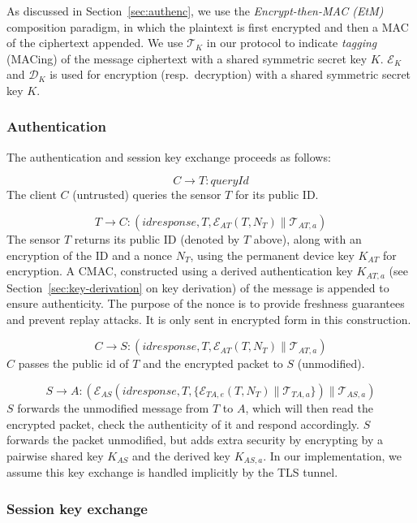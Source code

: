 As discussed in Section~\ref{sec:authenc}, we use the \textit{Encrypt-then-MAC (EtM)}  composition paradigm, in which the plaintext is first encrypted and then a MAC of the ciphertext appended. We use $\mathcal{T}_K$ in our protocol to indicate \textit{tagging} (MACing) of the message ciphertext with a shared symmetric secret key $K$. $\mathcal{E}_K$ and $\mathcal{D}_K$ is used for encryption (resp.\ decryption) with a shared symmetric secret key $K$.

\subsubsection{Authentication}

The authentication and session key exchange proceeds as follows:

\[
C \rightarrow T: \textit{queryId}
\]
%
The client $C$ (untrusted) queries the sensor $T$ for its public ID.

\[
T \rightarrow C: (\textit{idresponse}, T, \mathcal{E}_{AT}(T, N_T) \parallel \mathcal{T}_{AT,a})
\]
%
The sensor $T$ returns its public ID (denoted by $T$ above), along with an encryption of 
the ID and a nonce $N_T$, using the permanent device key $K_{AT}$ for
encryption. A CMAC, constructed using a derived authentication key $K_{AT,a}$ 
(see Section~\ref{sec:key-derivation} on key derivation) of the message is appended to ensure authenticity. 
The purpose of the nonce is to provide freshness guarantees and prevent replay attacks. 
It is only sent in encrypted form in this construction.

\[
C\rightarrow S: (idresponse,T,\mathcal{E}_{AT}(T,N_T) \parallel \mathcal{T}_{AT,a})
\]
%
$C$ passes the public id of $T$ and the encrypted packet to $S$ (unmodified).

\[
S \rightarrow A: (\mathcal{E}_{AS}(idresponse,T, \{
\mathcal{E}_{TA,e}(T,N_T) \parallel \mathcal{T}_{TA,a} \}) \parallel
\mathcal{T}_{AS,a})
\]
%
$S$ forwards the unmodified message from $T$ to $A$, which will then
read the encrypted packet, check the authenticity of it and respond
accordingly. $S$ forwards the packet unmodified, but adds extra security
by encrypting by a pairwise shared key $K_{AS}$ and the derived key
$K_{AS,a}$. In our implementation, we assume this key exchange is handled implicitly by the TLS tunnel.

\subsubsection{Session key exchange}

